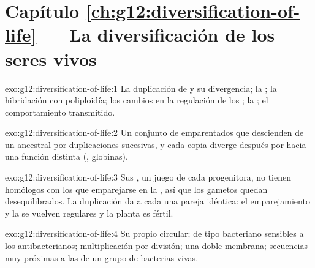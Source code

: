 \section*{Capítulo \ref{ch:g12:diversification-of-life} --- La diversificación de los seres vivos}

\begin{solution}{exo:g12:diversification-of-life:1}
La duplicación de  y su divergencia; la ; la hibridación con poliploidía; los cambios en la regulación
de los ; la ; el comportamiento
transmitido.
\end{solution}

\begin{solution}{exo:g12:diversification-of-life:2}
Un conjunto de  emparentados que descienden de un  ancestral
por duplicaciones sucesivas, y cada copia diverge después por 
hacia una función distinta (, globinas).
\end{solution}

\begin{solution}{exo:g12:diversification-of-life:3}
Sus , un juego de cada  progenitora, no tienen
homólogos con los que emparejarse en la , así que los gametos
quedan desequilibrados. La duplicación da a cada  una pareja
idéntica: el emparejamiento y la  se vuelven regulares y la
planta es fértil.
\end{solution}

\begin{solution}{exo:g12:diversification-of-life:4}
Su propio  circular;  de tipo bacteriano sensibles a los
 antibacterianos; multiplicación por división; una doble
membrana; secuencias muy próximas a las de un grupo de bacterias vivas.
\end{solution}

